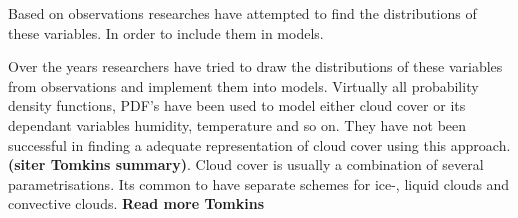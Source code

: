 Based on observations researches have attempted to find the distributions of these variables. In order to include them in models. 

Over the years researchers have tried to draw the distributions of these variables from observations and implement them into models. Virtually all probability density functions, PDF's have been used to model either cloud cover or its dependant variables humidity, temperature and so on. They have not been successful in finding a adequate representation of cloud cover using this approach. \textbf{(siter Tomkins summary)}. Cloud cover is usually a combination of several parametrisations. Its common to have separate schemes for ice-, liquid clouds and convective clouds. \textbf{Read more Tomkins}
\\ \\ 
